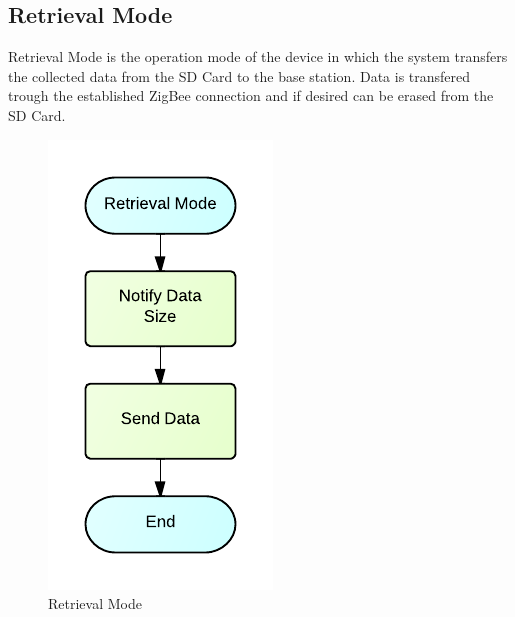 \subsection{Retrieval Mode}
Retrieval Mode is the operation mode of the device in which the system transfers the collected data from the SD Card to the base station. Data is transfered trough the established ZigBee connection and if desired can be erased from the SD Card.
\begin{figure}[H]
	\centering
	\includegraphics[scale=1.0]{img/RetrievalMode}
	\caption{Retrieval Mode \label{fig:retrivalMode}}
\end{figure}



